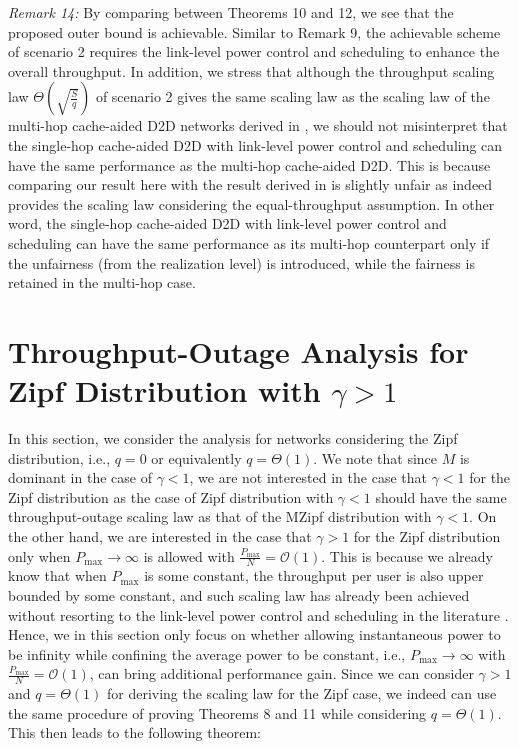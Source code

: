 \documentclass[journal,draftclsnofoot,onecolumn,12pt,twoside]{IEEEtran}
\begin{document}
{\em Remark 14:} By comparing between Theorems 10 and 12, we see that the proposed outer bound is achievable. Similar to Remark 9, the achievable scheme of scenario 2 requires the link-level power control and scheduling to enhance the overall throughput. In addition, we stress that although the throughput scaling law $\Theta\left(\sqrt{\frac{S}{q}}\right)$ of scenario 2 gives the same scaling law as the scaling law of the multi-hop cache-aided D2D networks derived in \cite{lee2020optimal}, we should not misinterpret that the single-hop cache-aided D2D with link-level power control and scheduling can have the same performance as the multi-hop cache-aided D2D. This is because comparing our result here with the result derived in \cite{lee2020optimal} is slightly unfair as \cite{lee2020optimal} indeed provides the scaling law considering the equal-throughput assumption. In other word, the single-hop cache-aided D2D with link-level power control and scheduling can have the same performance as its multi-hop counterpart only if the unfairness (from the realization level) is introduced, while the fairness is retained in the multi-hop case.

\section{Throughput-Outage Analysis for Zipf Distribution with $\gamma>1$}

\label{Sec:Zipf_gg1}

In this section, we consider the analysis for networks considering the Zipf distribution, i.e., $q=0$ or equivalently $q=\Theta(1)$. We note that since $M$ is dominant in the case of $\gamma<1$, we are not interested in the case that $\gamma<1$ for the Zipf distribution as the case of Zipf distribution with $\gamma<1$ should have the same throughput-outage scaling law as that of the MZipf distribution with $\gamma<1$. On the other hand, we are interested in the case that $\gamma>1$ for the Zipf distribution only when $P_{\text{max}}\to\infty$ is allowed with $\frac{P_{\text{max}}}{N}=\mathcal{O}(1)$. This is because we already know that when $P_{\text{max}}$ is some constant, the throughput per user is also upper bounded by some constant, and such scaling law has already been achieved without resorting to the link-level power control and scheduling in the literature \cite{lee2019throughput}. Hence, we in this section only focus on whether allowing instantaneous power to be infinity while confining the average power to be constant, i.e., $P_{\text{max}}\to\infty$ with $\frac{P_{\text{max}}}{N}=\mathcal{O}(1)$, can bring additional performance gain. Since we can consider $\gamma>1$ and $q=\Theta(1)$ for deriving the scaling law for the Zipf case, we indeed can use the same procedure of proving Theorems 8 and 11 while considering $q=\Theta(1)$. This then leads to the following theorem:
\end{document}
